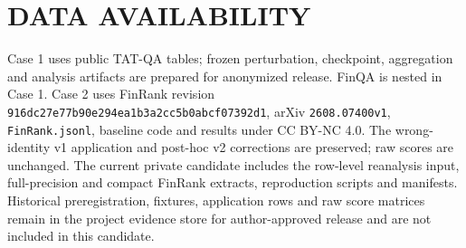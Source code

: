 \documentclass[a4paper,twoside]{article}
\begin{document}
\section{\uppercase{Data Availability}}
Case 1 uses public TAT-QA tables; frozen perturbation, checkpoint, aggregation and analysis artifacts are prepared for anonymized release. FinQA is nested in Case 1. Case 2 uses FinRank revision \texttt{916dc27e77b90e294ea1b3a2cc5b0abcf07392d1}, arXiv \texttt{2608.07400v1}, \texttt{FinRank.jsonl}, baseline code and results under CC BY-NC 4.0. The wrong-identity v1 application and post-hoc v2 corrections are preserved; raw scores are unchanged. The current private candidate includes the row-level reanalysis input, full-precision and compact FinRank extracts, reproduction scripts and manifests. Historical preregistration, fixtures, application rows and raw score matrices remain in the project evidence store for author-approved release and are not included in this candidate.
{\small


}
\end{document}
